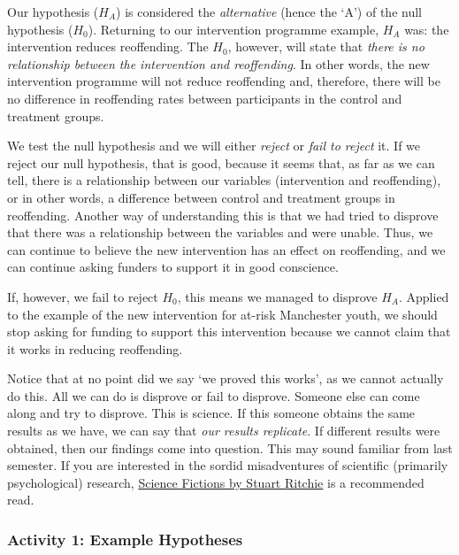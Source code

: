 \documentclass[
]{book}
\begin{document}
Our hypothesis (\(H_A\)) is considered the \emph{alternative} (hence the `A') of the null hypothesis (\(H_0\)). Returning to our intervention programme example, \(H_A\) was: the intervention reduces reoffending. The \(H_0\), however, will state that \emph{there is no relationship between the intervention and reoffending}. In other words, the new intervention programme will not reduce reoffending and, therefore, there will be no difference in reoffending rates between participants in the control and treatment groups.

We test the null hypothesis and we will either \emph{reject} or \emph{fail to reject} it. If we reject our null hypothesis, that is good, because it seems that, as far as we can tell, there is a relationship between our variables (intervention and reoffending), or in other words, a difference between control and treatment groups in reoffending. Another way of understanding this is that we had tried to disprove that there was a relationship between the variables and were unable. Thus, we can continue to believe the new intervention has an effect on reoffending, and we can continue asking funders to support it in good conscience.

If, however, we fail to reject \(H_0\), this means we managed to disprove \(H_A\). Applied to the example of the new intervention for at-risk Manchester youth, we should stop asking for funding to support this intervention because we cannot claim that it works in reducing reoffending.

Notice that at no point did we say `we proved this works', as we cannot actually do this. All we can do is disprove or fail to disprove. Someone else can come along and try to disprove. This is science. If this someone obtains the same results as we have, we can say that \emph{our results replicate}. If different results were obtained, then our findings come into question. This may sound familiar from last semester. If you are interested in the sordid misadventures of scientific (primarily psychological) research, \href{https://www.penguin.co.uk/books/111/1117290/science-fictions/9781847925657.html}{Science Fictions by Stuart Ritchie} is a recommended read.

\hypertarget{activity-1-example-hypotheses}{%
\subsubsection{Activity 1: Example Hypotheses}\label{activity-1-example-hypotheses}}
\end{document}
